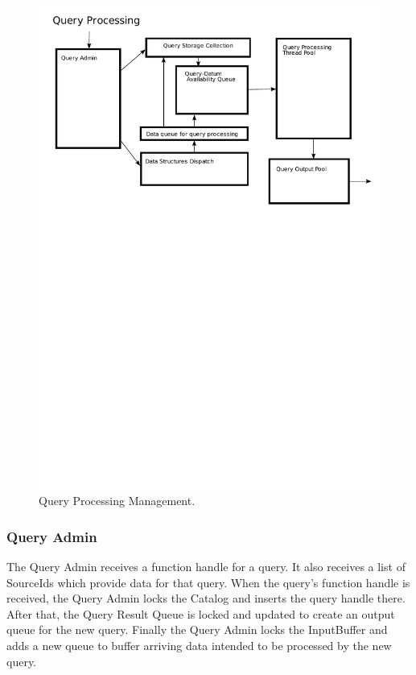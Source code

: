 \documentclass[14pt]{article}
\begin{document}
\begin{figure}
  \includegraphics[width=5.00in]{figures/QueryProcessing.pdf}
  \caption{Query Processing Management.}
  \label{fig:query-processor}
\end{figure}

\subsubsection{Query Admin}

The Query Admin receives a function handle for a query. It also receives a list
of SourceIds which provide data for that query. When the query's function handle
is received, the Query Admin locks the Catalog and inserts the query handle
there. After that, the Query Result Queue is locked and updated to create an
output queue for the new query. Finally the Query Admin locks the InputBuffer
and adds a new queue to buffer arriving data intended to be processed by the new
query.
\end{document}
